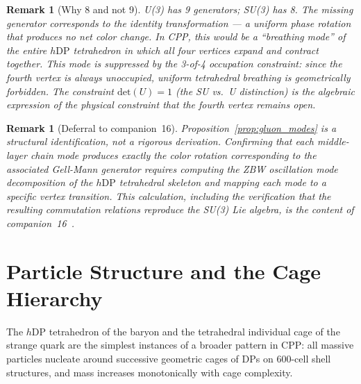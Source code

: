 \documentclass[12pt]{article}
\newtheorem{remark}[theorem]{Remark}
\newcommand{\hDP}{h\mathrm{DP}}
\begin{document}
\begin{remark}[Why 8 and not 9]
U(3) has 9 generators; SU(3) has 8.  The missing generator
corresponds to the identity transformation --- a uniform phase
rotation that produces no net color change.  In CPP, this would
be a ``breathing mode'' of the entire $\hDP$ tetrahedron in which
all four vertices expand and contract together.  This mode is
suppressed by the 3-of-4 occupation constraint: since the fourth
vertex is always unoccupied, uniform tetrahedral breathing is
geometrically forbidden.  The constraint $\mathrm{det}(U) = 1$
(the SU vs.\ U distinction) is the algebraic expression of the
physical constraint that the fourth vertex remains open.
\end{remark}

\begin{remark}[Deferral to companion~16]
Proposition~\ref{prop:gluon_modes} is a structural identification,
not a rigorous derivation.  Confirming that each middle-layer chain
mode produces exactly the color rotation corresponding to the
associated Gell-Mann generator requires computing the ZBW oscillation
mode decomposition of the $\hDP$ tetrahedral skeleton and mapping
each mode to a specific vertex transition.  This calculation, including
the verification that the resulting commutation relations reproduce
the SU(3) Lie algebra, is the content of companion~16~\cite{c16}.
\end{remark}

\section{Particle Structure and the Cage Hierarchy}
\label{sec:cages}

The $\hDP$ tetrahedron of the baryon and the tetrahedral individual
cage of the strange quark are the simplest instances of a broader
pattern in CPP: all massive particles nucleate around successive
geometric cages of DPs on 600-cell shell structures, and mass
increases monotonically with cage complexity.
\end{document}
